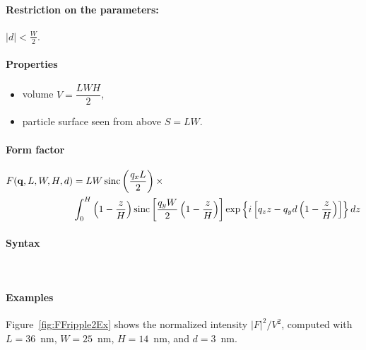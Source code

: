 \paragraph{Restriction on the parameters:} $|d| < \frac{W}{2} $.

\paragraph{Properties}
\begin{itemize}
\item volume $V = \dfrac{L W H}{2}$,
\item particle surface seen from above $S = L W$.
\end{itemize}

\paragraph{Form factor}
\begin{align*}
F(\mathbf{q},L,W,H,d) &=L W
\operatorname{sinc}\left(\frac{q_xL}{2}\right)\times \\ &
\int_0^H 
\left(1-\frac{z}{H}\right)
 \operatorname{sinc}\left[\frac{q_y
    W}{2}\left(1-\frac{z}{H}\right)\right] 
\exp\left\{ i\left[q_zz -
    q_yd\left(1-\frac{z}{H}\right)\right]\right\} 
dz
\end{align*}

\paragraph{Syntax}\strut\\

\paragraph{Examples}
Figure~\ref{fig:FFripple2Ex} shows the normalized intensity
$|F|^2/V^2$, computed with $L=36$~nm, $W=25$~nm, $H=14$~nm, and $d=3$~nm.

